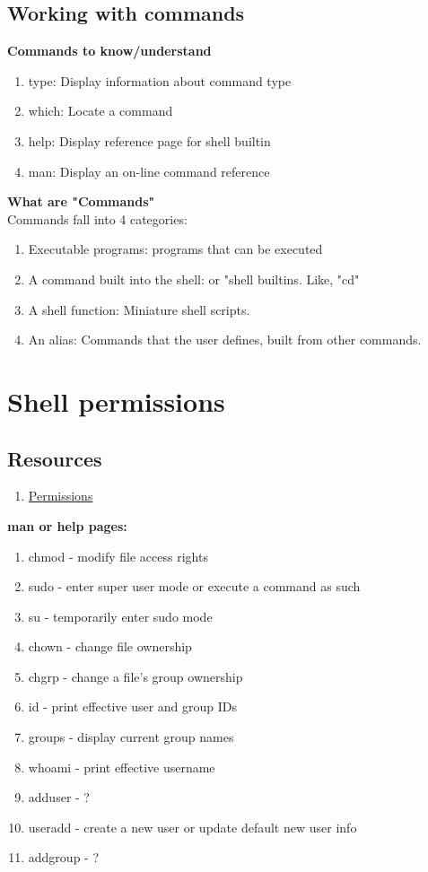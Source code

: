 \documentclass[12pt, letterpaper]{report}
\begin{document}
\section{Working with commands}
\textbf{Commands to know/understand}
\begin{enumerate}
	\item type: Display information about command type
	\item which: Locate a command
	\item help: Display reference page for shell builtin
	\item man: Display an on-line command reference
\end{enumerate}

\textbf{What are "Commands"}\\
Commands fall into 4 categories:
\begin{enumerate}
	\item Executable programs: programs that can be executed
	\item A command built into the shell: or "shell builtins. Like, "cd"
	\item A shell function: Miniature shell scripts.
	\item An alias: Commands that the user defines, built from other commands.
\end{enumerate}

\clearpage
\chapter{Shell permissions}
\section{Resources}
\begin{enumerate}
	\item \href{http://linuxcommand.org/lc3_lts0090.php}{Permissions}
\end{enumerate}

\textbf{man or help pages:}
\begin{enumerate}
	\item chmod - modify file access rights
	\item sudo - enter super user mode or execute a command as such
	\item su - temporarily enter sudo mode
	\item chown - change file ownership
	\item chgrp - change a file's group ownership
	\item id - print effective user and group IDs
	\item groups - display current group names
	\item whoami - print effective username
	\item adduser - ?
	\item useradd - create a new user or update default new user info
	\item addgroup - ?
\end{enumerate}
\end{document}
